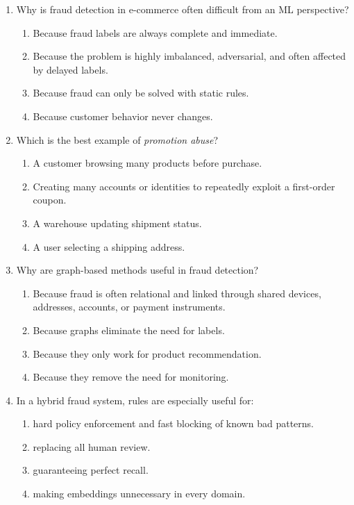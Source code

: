 \begin{enumerate}
  \item Why is fraud detection in e-commerce often difficult from an ML perspective?
  \begin{enumerate}
    \item Because fraud labels are always complete and immediate.
    \item Because the problem is highly imbalanced, adversarial, and often affected by delayed labels.
    \item Because fraud can only be solved with static rules.
    \item Because customer behavior never changes.
  \end{enumerate}

  \item Which is the best example of \emph{promotion abuse}?
  \begin{enumerate}
    \item A customer browsing many products before purchase.
    \item Creating many accounts or identities to repeatedly exploit a first-order coupon.
    \item A warehouse updating shipment status.
    \item A user selecting a shipping address.
  \end{enumerate}

  \item Why are graph-based methods useful in fraud detection?
  \begin{enumerate}
    \item Because fraud is often relational and linked through shared devices, addresses, accounts, or payment instruments.
    \item Because graphs eliminate the need for labels.
    \item Because they only work for product recommendation.
    \item Because they remove the need for monitoring.
  \end{enumerate}

  \item In a hybrid fraud system, rules are especially useful for:
  \begin{enumerate}
    \item hard policy enforcement and fast blocking of known bad patterns.
    \item replacing all human review.
    \item guaranteeing perfect recall.
    \item making embeddings unnecessary in every domain.
  \end{enumerate}


\end{enumerate}
